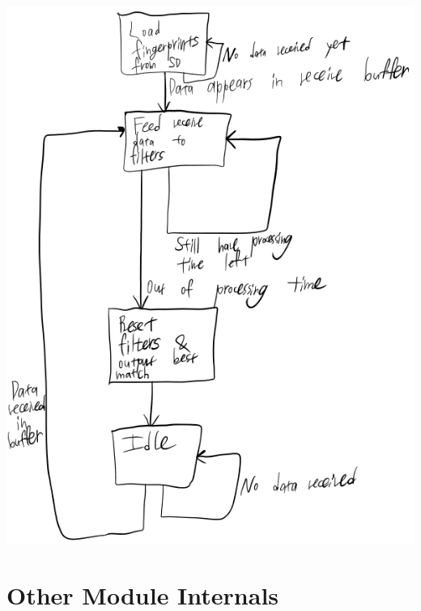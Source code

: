 \documentclass{article}
\begin{document}
\includegraphics[width=6.5in]{FSMs.png}

\section{Other Module Internals}
\end{document}
